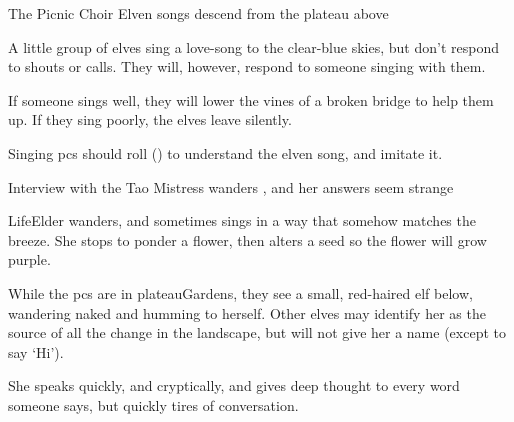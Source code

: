 
{The Picnic Choir}%
{Elven songs descend from the plateau above}%

A little group of elves sing a love-song to the clear-blue skies, but don't respond to shouts or calls.
They will, however, respond to someone singing with them.

If someone sings well, they will lower the vines of a broken bridge to help them up.
If they sing poorly, the elves leave silently.

Singing \glspl{pc} should roll  (\tn[10]) to understand the elven song, and imitate it.

{Interview with the Tao Mistress}%
{ wanders , and her answers seem strange}%

\Gls{LifeElder} wanders, and sometimes sings in a way that somehow matches the breeze.
She stops to ponder a flower, then alters a seed so the flower will grow purple.

While the \glspl{pc} are in \gls{plateauGardens}, they see a small, red-haired elf below, wandering naked and humming to herself.
Other elves may identify her as the source of all the change in the landscape, but will not give her a name (except to say `Hi').

She speaks quickly, and cryptically, and gives deep thought to every word someone says, but quickly tires of conversation.

